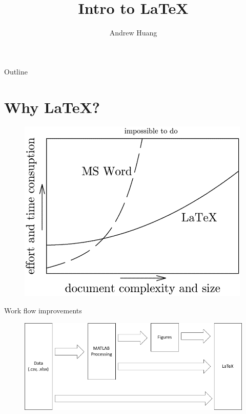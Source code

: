 \documentclass[aspectratio=169]{beamer}
\title{Intro to \LaTeX}
\author{Andrew Huang}
\institute[University of Melbourne]
\begin{document}
\begin{frame}
    \maketitle
\end{frame}

\begin{frame}{Outline}
	\tableofcontents
\end{frame}

\section{Why \LaTeX?}
\begin{frame}{\insertsection}
	\begin{figure}
		\includegraphics[scale=0.5]{./Images/latex-difficulty-2.png}
	\end{figure}
\end{frame}

\begin{frame}{\insertsection}{Work flow improvements}
	\begin{figure}
		\includegraphics[width=0.7\linewidth]{./Images/workflow.pdf}
	\end{figure}
\end{frame}
\end{document}
